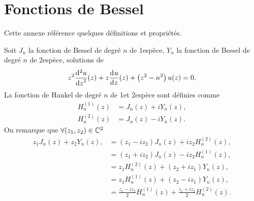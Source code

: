 \section{Fonctions de Bessel}

Cette annexe référence quelques définitions et propriétés.

Soit \(J_n\) la fonction de Bessel de degré \(n\) de 1\iere espèce, \(Y_n\) la fonction de Bessel de degré \(n\) de 2\ieme espèce, solutions de
\begin{equation}
    z^2 \ddp[2]{z}{u}(z) + z\ddp{z}{u}(z)+\left(z^2-n^2\right)u(z) = 0.
\end{equation}
La fonction de Hankel de degré \(n\) de 1\iere et 2\ieme espèce sont définies comme
\begin{align}
    H_n^{(1)}(z) &= J_n(z) + iY_n(z),
    \\
    H_n^{(2)}(z) &= J_n(z) - iY_n(z).
\end{align}
On remarque que \(\forall (z_1,z_2) \in \CC^2\)
\begin{equation}
\begin{aligned}
z_1 J_n(z) + z_2 Y_n(z),
&= ( z_1 - i z_2 ) J_n(z) + iz_2 H_n^{(2)}(z),
\\
&= ( z_1 + i z_2 ) J_n(z) - iz_2 H_n^{(1)}(z),
\\
&= z_1 H_n^{(2)}(z) + ( z_2 + i z_1 ) Y_n(z),
\\
&= z_1 H_n^{(1)}(z) + ( z_2 - i z_1 ) Y_n(z),
\\
&= \frac{z_1-iz_2}{2}H_n^{(1)}(z) + \frac{z_1+iz_2}{2}H_n^{(2)}(z).
\end{aligned}
\label{eq:annex:bessel:equiv_bessel}
\end{equation}
